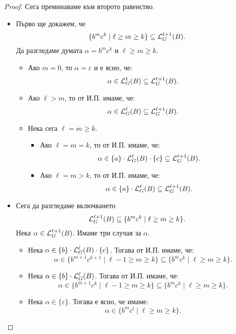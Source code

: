\begin{proof}
  Сега преминаваме към второто равенство.
  \begin{itemize}
  \item
    Първо ще докажем, че
    \[\{b^mc^k \mid \ell \geq m \geq k\} \subseteq \mathcal{L}^{\ell+1}_G(B).\]
    Да разгледаме думата $\alpha = b^mc^k$ и $\ell \geq m \geq k$.
    \begin{itemize}
    \item
      Ако $m = 0$, то $\alpha = \varepsilon$ и е ясно, че:
      \[\alpha \in \mathcal{L}^{1}_G(B) \subseteq \mathcal{L}^{\ell+1}_G(B).\]
    \item
      Ако $\ell > m$, то от И.П. имаме, че:
      \[\alpha \in \mathcal{L}^{\ell}_G(B) \subseteq \mathcal{L}^{\ell+1}_G(B).\]
    \item
      Нека сега $\ell = m \geq k$.
      \begin{itemize}
      \item
        Ако $\ell = m = k$, то от И.П. имаме, че:
        \[\alpha \in \{a\} \cdot \mathcal{L}^\ell_G(B) \cdot \{c\} \subseteq \mathcal{L}^{\ell+1}_G(B).\]
      \item
        Ако $\ell = m > k$, то от И.П. имаме, че:
        \[\alpha \in \{a\} \cdot \mathcal{L}^\ell_G(B) \subseteq \mathcal{L}^{\ell+1}_G(B).\]
      \end{itemize}
    \end{itemize}
  \item
    Сега да разгледаме включването
    \[\mathcal{L}^{\ell+1}_G(B) \subseteq \{b^mc^k \mid \ell \geq m \geq k\}.\]
    Нека $\alpha \in \mathcal{L}^{\ell+1}_G(B)$. Имаме три случая за $\alpha$.
    \begin{itemize}
    \item
      Нека $\alpha \in \{b\} \cdot \mathcal{L}^\ell_G(B) \cdot \{c\}$. Тогава от И.П. имаме, че:
      \[\alpha \in \{b^{m+1}c^{k+1} \mid \ell-1\geq m \geq k\} \subseteq \{b^mc^k \mid \ell \geq m \geq k\}.\]
    \item
      Нека $\alpha \in \{b\} \cdot \mathcal{L}^\ell_G(B)$. Тогава от И.П. имаме, че:
      \[\alpha \in \{b^{m+1}c^{k} \mid \ell-1\geq m \geq k\} \subseteq \{b^mc^k \mid \ell \geq m \geq k\}.\]
    \item
      Нека $\alpha \in \{\varepsilon\}$. Тогава е ясно, че имаме:
      \[\alpha \in \{b^mc^l \mid \ell \geq m \geq k\}.\]
    \end{itemize}
  \end{itemize}
  

\end{proof}
